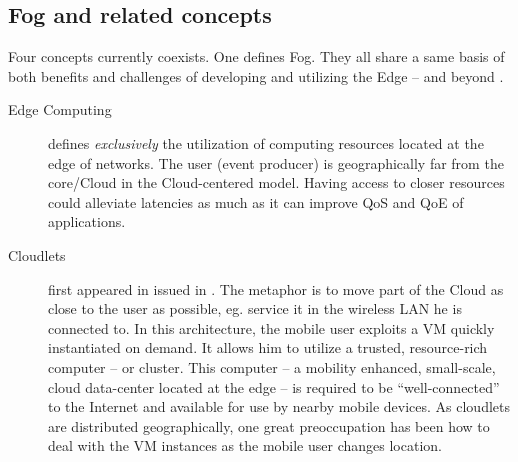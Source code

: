 \documentclass[11pt]{sdm}
\begin{document}
\subsection{Fog and related concepts}

Four concepts currently coexists. One defines Fog. They all share a same basis of both benefits and challenges of developing and utilizing the Edge -- and beyond \cite{george_nanolambda_2020}.

\begin{description}
	\item[Edge Computing] defines \emph{exclusively} the utilization of computing resources located at the edge of networks. The user (event producer) is geographically far from the core/Cloud in the Cloud-centered model. Having access to closer resources could alleviate latencies as much as it can improve \gls{QoS} and \gls{QoE} of applications.

	\item[Cloudlets] first appeared in \cite{satyanarayanan_case_2009} issued in . The metaphor is to move part of the Cloud as close to the user as possible, eg. service it in the wireless LAN he is connected to. In this architecture, the mobile user exploits a \gls{VM} quickly instantiated on demand. It allows him to utilize a trusted, resource-rich computer -- or cluster. This computer -- a mobility enhanced, small-scale, cloud data-center located at the edge -- is required to be ``well-connected'' to the Internet and available for use by nearby mobile devices. As cloudlets are distributed geographically, one great preoccupation has been how to deal with the \gls{VM} instances as the mobile user changes location.


\end{description}
\end{document}
